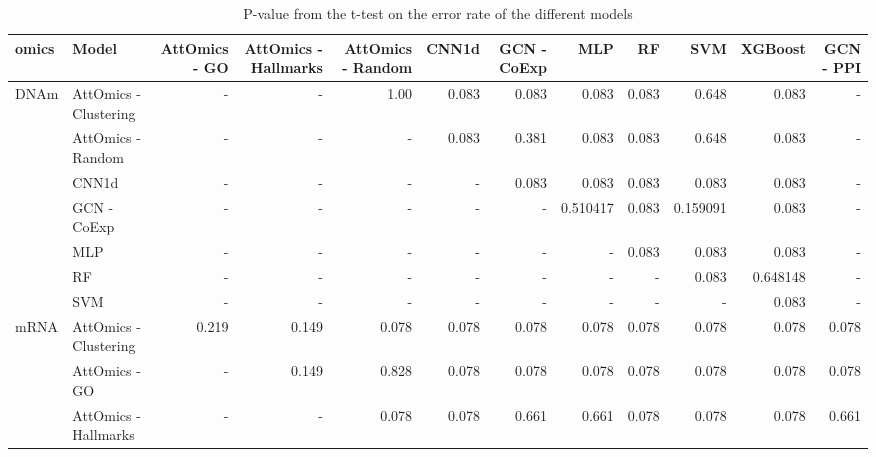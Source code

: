 \begin{sidewaystable}
	\centering
	\caption{P-value from the t-test on the error rate of the different models}\label{tab:pval_error_rate}
	\begin{tabular}{llrrrrrrrrrr}
		\toprule
		omics                  & Model                 & AttOmics - GO & AttOmics - Hallmarks & AttOmics - Random & CNN1d & GCN - CoExp & MLP      & RF    & SVM      & XGBoost  & GCN - PPI \\
		\midrule
		\multirow{7}{*}{DNAm}  & AttOmics - Clustering & -             & -                    & 1.00              & 0.083 & 0.083       & 0.083    & 0.083 & 0.648    & 0.083    & -         \\
		                       & AttOmics - Random     & -             & -                    & -                 & 0.083 & 0.381       & 0.083    & 0.083 & 0.648    & 0.083    & -         \\
		                       & CNN1d                 & -             & -                    & -                 & -     & 0.083       & 0.083    & 0.083 & 0.083    & 0.083    & -         \\
		                       & GCN - CoExp           & -             & -                    & -                 & -     & -           & 0.510417 & 0.083 & 0.159091 & 0.083    & -         \\
		                       & MLP                   & -             & -                    & -                 & -     & -           & -        & 0.083 & 0.083    & 0.083    & -         \\
		                       & RF                    & -             & -                    & -                 & -     & -           & -        & -     & 0.083    & 0.648148 & -         \\
		                       & SVM                   & -             & -                    & -                 & -     & -           & -        & -     & -        & 0.083    & -         \\
		\midrule
		\multirow{10}{*}{mRNA} & AttOmics - Clustering & 0.219         & 0.149                & 0.078             & 0.078 & 0.078       & 0.078    & 0.078 & 0.078    & 0.078    & 0.078     \\
		                       & AttOmics - GO         & -             & 0.149                & 0.828             & 0.078 & 0.078       & 0.078    & 0.078 & 0.078    & 0.078    & 0.078     \\
		                       & AttOmics - Hallmarks  & -             & -                    & 0.078             & 0.078 & 0.661       & 0.661    & 0.078 & 0.078    & 0.078    & 0.661     \\

\end{tabular}
\end{sidewaystable}
